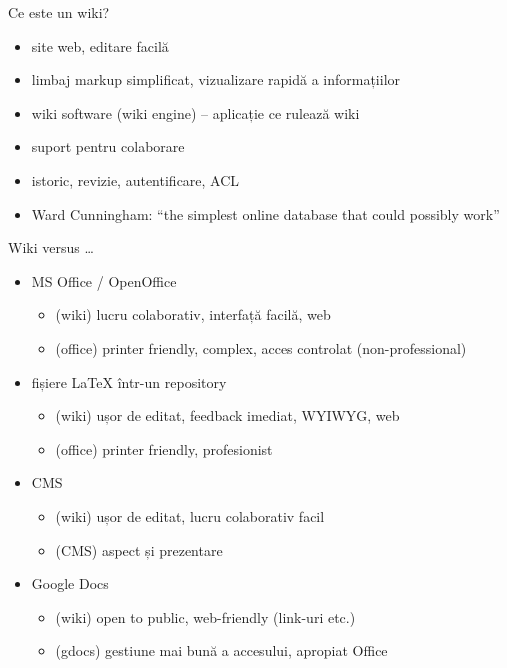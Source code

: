 \documentclass{beamer}
\begin{document}
\begin{frame}{Ce este un wiki?}
  \begin{itemize}
    \item site web, editare facilă
    \item limbaj markup simplificat, vizualizare rapidă a informațiilor
    \item wiki software (wiki engine) -- aplicație ce rulează wiki
    \item suport pentru colaborare
    \item istoric, revizie, autentificare, ACL
    \item Ward Cunningham: ``the simplest online database that could possibly
work''
  \end{itemize}
\end{frame}

\begin{frame}{Wiki versus \ldots}
  \begin{itemize}
    \item MS Office / OpenOffice
      \begin{itemize}
        \item (wiki) lucru colaborativ, interfață facilă, web
        \item (office) printer friendly, complex, acces controlat
    (non-professional)
      \end{itemize}
    \item fișiere LaTeX într-un repository
      \begin{itemize}
        \item (wiki) ușor de editat, feedback imediat, WYIWYG, web
        \item (office) printer friendly, profesionist
      \end{itemize}
    \item CMS
      \begin{itemize}
        \item (wiki) ușor de editat, lucru colaborativ facil
        \item (CMS) aspect și prezentare
      \end{itemize}
    \item Google Docs
      \begin{itemize}
        \item (wiki) open to public, web-friendly (link-uri etc.)
        \item (gdocs) gestiune mai bună a accesului, apropiat Office
      \end{itemize}
  \end{itemize}
\end{frame}
\end{document}
